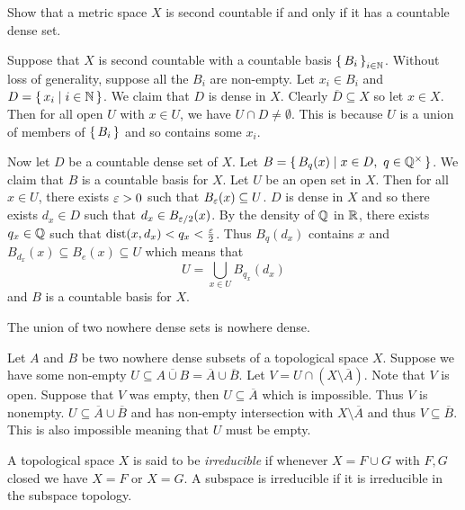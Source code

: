 \documentclass[letterpaper, 11pt, oneside]{book}
\begin{document}
\begin{exercise}\label{exercise: countable_iff_countable_dense}
  Show that a metric space $X$ is second countable if and only if it has a countable dense set.
\end{exercise}
\begin{pf}
  Suppose that $X$ is second countable with a countable basis $\set{B_{i}}_{i \in \mathbb{N}}$.
  Without loss of generality, suppose all the $B_{i}$ are non-empty.
  Let $x_{i} \in B_{i}$ and $D = \set{x_{i} \mid i \in \mathbb{N}}$.
  We claim that $D$ is dense in $X$.
  Clearly $\overline{D} \subseteq X$ so let $x \in X$.
  Then for all open $U$ with $x \in U$, we have $U \cap D \neq \emptyset$.
  This is because $U$ is a union of members of $\set{B_{i}}$ and so contains some $x_{i}$.

  Now let $D$ be a countable dense set of $X$.
  Let $B = \set{B_{q}(x) | x \in D,~ q \in \mathbb{Q}^{\times}}$.
  We claim that $B$ is a countable basis for $X$.
  Let $U$ be an open set in $X$.
  Then for all $x \in U$, there exists $\varepsilon > 0$ such that $B_{\varepsilon}(x) \subseteq U$.
  $D$ is dense in $X$ and so there exists $d_{x} \in D$ such that $d_{x} \in B_{\varepsilon /2}(x)$.
  By the density of $\mathbb{Q}$ in $\mathbb{R}$, there exists $q_{x} \in \mathbb{Q}$ such that $\operatorname{dist}(x, d_{x}) < q_{x} < \frac{\varepsilon}{2}$.
  Thus $B_{q}(d_{x})$ contains $x$ and $B_{d_{x}}(x) \subseteq B_{e}(x) \subseteq U$ which means that
  \[
    U = \bigcup_{x \in U} B_{q_{x}}(d_{x})
  \]
  and $B$ is a countable basis for $X$.
\end{pf}

\begin{exercise}
  The union of two nowhere dense sets is nowhere dense.
\end{exercise}
\begin{pf}
  Let $A$ and $B$ be two nowhere dense subsets of a topological space $X$.
  Suppose we have some non-empty $U \subseteq \overline{A \cup B} = \overline{A} \cup \overline{B}$.
  Let $V = U \cap (X \setminus \overline{A})$.
  Note that $V$ is open.
  Suppose that $V$ was empty, then $U \subseteq \overline{A}$ which is impossible.
  Thus $V$ is nonempty.
  $U \subseteq \overline{A} \cup \overline{B}$ and has non-empty intersection with $X \setminus \overline{A}$ and thus $V \subseteq \overline{B}$.
  This is also impossible meaning that $U$ must be empty.
\end{pf}

\clearpage

\begin{defn}
  A topological space $X$ is said to be \emph{irreducible} if whenever $X = F \cup G$ with $F, G$ closed we have $X = F$ or $X = G$.
  A subspace is irreducible if it is irreducible in the subspace topology.
\end{defn}
\end{document}
